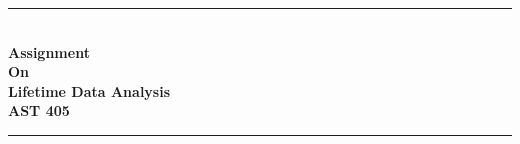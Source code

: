 \documentclass[
  12pt,
  oneside]{article}
\author{}
\date{\vspace{-2.5em}}
\begin{document}
%
%
%



\begin{titlepage}

\newcommand{\HRule}{\rule{\linewidth}{0.5mm}} %

\center %

%


\begin{minipage}{3cm}
\vspace{3cm}
\end{minipage}


\HRule \\[0.25cm]
{ \huge \bfseries Assignment}\\[0.06cm]
{ \huge \bfseries On}\\[0.1cm]
{ \huge \bfseries Lifetime Data Analysis}\\[0.08cm]
{ \LARGE \bfseries AST 405}\\[0.05cm]
\HRule \\[1.5cm]



\end{titlepage}
\end{document}
